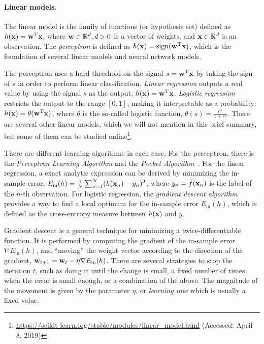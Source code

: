 \paragraph{Linear models.} The linear model is the family of functions (or
hypothesis set) defined as $h(\boldsymbol{\mathbf{x}}) = \boldsymbol{\mathbf{w}}^{\text{T}}\boldsymbol{\mathbf{x}}$, where
$\boldsymbol{\mathbf{w}} \in \mathbb{R}^\textit{d}, \textit{d} > 0$ is a vector of weights, and
$\boldsymbol{\mathbf{x}}\in \mathbb{R}^\textit{d}$ is an observation. 
%
The {\em perceptron} is defined as $h(\boldsymbol{\mathbf{x}}) =
\text{sign}(\boldsymbol{\mathbf{w}}^{\text{T}}\boldsymbol{\mathbf{x}})$, which is the foundation of several
linear models and neural network models.


The perceptron uses a hard threshold on the signal $s =
\boldsymbol{\mathbf{w}}^{\text{T}}\boldsymbol{\mathbf{x}}$ by taking the sign of $s$ in order to perform linear
classification.
%
{\em Linear regression} outputs a real value by using the signal $s$ as the
output, $h(\boldsymbol{\mathbf{x}}) = \boldsymbol{\mathbf{w}}^{\text{T}}\boldsymbol{\mathbf{x}}$.
%
{\em Logistic regression} restricts the output to the range $[0, 1]$, making
it interpretable as a probability: $h(\boldsymbol{\mathbf{x}}) =
\theta(\boldsymbol{\mathbf{w}}^{\text{T}}\boldsymbol{\mathbf{x}})$, where $\theta$ is the so-called logistic
function, $\theta(s) = \frac{e^s}{1 + e^s}$.
%
There are several other linear models, which we will not mention in this brief
summary, but some of them can be studied
online\footnote{\url{https://scikit-learn.org/stable/modules/linear_model.html}
(Accessed: April 8, 2019)}.


There are different learning algorithms in each case. 
%
For the perceptron, there is the {\em Perceptron Learning Algorithm} and the
{\em Pocket Algorithm}~\cite{Abu-Mostafa:2012:LD:2207825}. 
%
For the linear regression, a exact analytic expression can be derived by
minimizing the in-sample error, $E_{\text{in}}(h) = \frac{1}{N} \sum_{n=1}^{N}
(h(\boldsymbol{\mathbf{x}}_n) - y_n)^2$, where $y_n = f(\boldsymbol{\mathbf{x}}_n)$ is the label of the $n$-th
observation.
%
For logistic regression, the {\em gradient descent algorithm} provides a way to
find a local optimum for the in-sample error $E_{\text{in}}(h)$, which is
defined as the cross-entropy measure between $h(\boldsymbol{\mathbf{x}})$ and $y$. 


Gradient descent is a general technique for minimizing a twice-differentiable
function. 
%
It is performed by computing the gradient of the in-sample error $\nabla
E_{\text{in}}(h)$, and ``moving'' the weight vector according to the direction
of the gradient, $\boldsymbol{\mathbf{w}}_{t+1} = \boldsymbol{\mathbf{w}}_t - \eta\nabla E_{\text{in}}(h)$.
%
There are several strategies to stop the iteration $t$, such as doing it until
the change is small, a fixed number of times, when the error is small enough, or
a combination of the above.
%
The magnitude of the movement is given by the parameter $\eta$, or {\em learning
rate} which is usually a fixed value.

